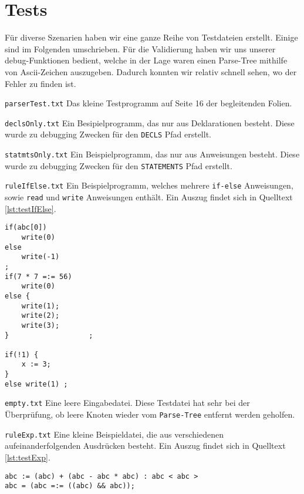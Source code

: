 \documentclass[
a4paper,   %
11pt,      %
oneside,   %
onecolumn, %
final      %
]{article}
\newcommand{\code}[1]{\lstinline$#1$}
\begin{document}
\section{Tests}
Für diverse Szenarien haben wir eine ganze Reihe von Testdateien erstellt. Einige sind im Folgenden umschrieben. Für die Validierung haben wir uns unserer debug-Funktionen bedient, welche in der Lage waren einen Parse-Tree mithilfe von Ascii-Zeichen auszugeben. Dadurch konnten wir relativ schnell sehen, wo der Fehler zu finden ist.

\begin{description}
\item{\texttt{parserTest.txt}} Das kleine Testprogramm auf Seite 16 der begleitenden Folien.

\item{\texttt{declsOnly.txt}} Ein Besipielprogramm, das nur aus Deklarationen besteht. Diese wurde zu debugging Zwecken für den \code{DECLS} Pfad erstellt.

\item{\texttt{statmtsOnly.txt}} Ein Beispielprogramm, das nur aus Anweisungen besteht. Diese wurde zu debugging Zwecken für den \code{STATEMENTS} Pfad erstellt.

\item{\texttt{ruleIfElse.txt}} Ein Beispielprogramm, welches mehrere \code{if-else} Anweisungen, sowie \code{read} und \code{write} Anweisungen enthält. Ein Auszug findet sich in Quelltext \ref{lst:testIfElse}.

\begin{lstlisting}[language=SysProgLang, firstnumber=16, caption={ruleIfElse.txt}, label=lst:testIfElse]
if(abc[0])
    write(0)
else
    write(-1)
;
if(7 * 7 =:= 56)
    write(0)
else {
    write(1);
    write(2);
    write(3);
}                   ;

if(!1) {
    x := 3;
}
else write(1) ;
\end{lstlisting}

\item{\texttt{empty.txt}} Eine leere Eingabedatei. Diese Testdatei hat sehr bei der Überprüfung, ob leere Knoten wieder vom \code{Parse-Tree} entfernt werden geholfen.

\item{\texttt{ruleExp.txt}} Eine kleine Beispieldatei, die aus verschiedenen aufeinanderfolgenden Ausdrücken besteht. Ein Auszug findet sich in Quelltext \ref{lst:testExp}.

\begin{lstlisting}[language=SysProgLang, caption={ruleExp.txt}, label=lst:testExp]
abc := (abc) + (abc - abc * abc) : abc < abc > 
abc = (abc =:= ((abc) && abc));


\end{lstlisting}
\end{description}
\end{document}
